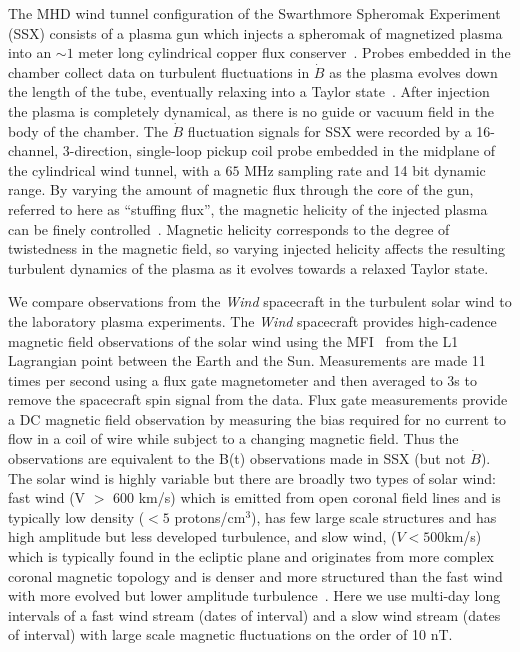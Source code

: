 \documentclass[aps,prx,twocolumn,secnumarabic,nobalancelastpage,amsmath,amssymb,
nofootinbib]{revtex4-1}
\begin{document}
The MHD wind tunnel configuration of the Swarthmore Spheromak Experiment (SSX) consists of a plasma gun which injects a spheromak of magnetized plasma into an $\sim1$ meter long cylindrical copper flux conserver~\cite{gray2013}. Probes embedded in the chamber collect data on turbulent fluctuations in $\dot{B}$ as the plasma evolves down the length of the tube, eventually relaxing into a Taylor state~\cite{gray2013,schaffner2014a,schaffner2014b,schaffner2014c}. After injection the plasma is completely dynamical, as there is no guide or vacuum field in the body of the chamber. The $\dot{B}$ fluctuation signals for SSX  were recorded by a 16-channel, 3-direction, single-loop pickup coil probe embedded in the midplane of the cylindrical wind tunnel, with a $65$ MHz sampling rate and 14 bit dynamic range. By varying the amount of magnetic flux through the core of the gun, referred to here as ``stuffing flux'', the magnetic helicity of the injected plasma can be finely controlled~\cite{schaffner2014b}. Magnetic helicity corresponds to the degree of twistedness in the magnetic field, so varying injected helicity affects the resulting turbulent dynamics of the plasma as it evolves towards a relaxed Taylor state. 

We compare observations from the {\it Wind} spacecraft in the turbulent solar wind to the laboratory plasma experiments. The {\it Wind} spacecraft provides high-cadence magnetic field observations of the solar wind using the MFI~\cite{lepping1995} from the L1 Lagrangian point between the Earth and the Sun. Measurements are made 11 times per second using a flux gate magnetometer and then averaged to 3s to remove the spacecraft spin signal from the data. Flux gate measurements provide a DC magnetic field observation by measuring the bias required for no current to flow in a coil of wire while subject to a changing magnetic field. Thus the observations are equivalent to the B(t) observations made in SSX (but not $\dot{B}$). The solar wind is highly variable but there are broadly two types of solar wind: fast wind (V $>$ 600 km/s) which is emitted from open coronal field lines and is typically low density ($< 5$ protons/cm$^3$), has few large scale structures and has high amplitude but less developed turbulence, and slow wind, ($V < 500 $km/s) which is typically found in the ecliptic plane and originates from more complex coronal magnetic topology and is denser and more structured than the fast wind with more evolved but lower amplitude turbulence~\cite{tu1990,bruno2013}. Here we use multi-day long intervals of a fast wind stream (dates of interval) and a slow wind stream (dates of interval) with large scale magnetic fluctuations on the order of 10 nT. 
\end{document}
